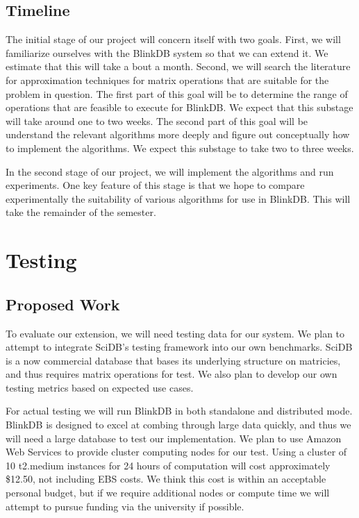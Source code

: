 \documentclass[twoside]{article}
\begin{document}
\begin{multicols}{2}
\subsection{Timeline}

The initial stage of our project will concern itself with two goals. First, we will familiarize ourselves with the BlinkDB system so that we can extend it. We estimate that this will take a bout a month. Second, we will search the literature for approximation techniques for matrix operations that are suitable for the problem in question. The first part of this goal will be to determine the range of operations that are feasible to execute for BlinkDB. We expect that this substage will take around one to two weeks. The second part of this goal will be understand the relevant algorithms more deeply and figure out conceptually how to implement the algorithms. We expect this substage to take two to three weeks.

In the second stage of our project, we will implement the algorithms and run experiments. One key feature of this stage is that we hope to compare experimentally the suitability of various algorithms for use in BlinkDB. This will take the remainder of the semester. 

\section{Testing}

\subsection{Proposed Work}
To evaluate our extension, we will need testing data for our system. We plan to attempt to integrate SciDB's testing framework into our own benchmarks. SciDB is a now commercial database that bases its underlying structure on matricies, and thus requires matrix operations for test. We also plan to develop our own testing metrics based on expected use cases.

For actual testing we will run BlinkDB in both standalone and distributed mode. BlinkDB is designed to excel at combing through large data quickly, and thus we will need a large database to test our implementation. We plan to use Amazon Web Services to provide cluster computing nodes for our test. Using a cluster of 10 
t2.medium instances for 24 hours of computation will cost approximately \$12.50, not including EBS costs. We think this cost is within an acceptable personal budget, but if we require additional nodes or compute time we will attempt to pursue funding via the university if possible.


\end{multicols}
\end{document}
